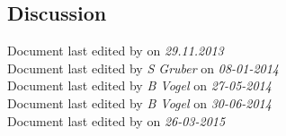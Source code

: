 \subsection*{Discussion}
Document last edited by \textit{\krauti} on \textit{29.11.2013}\\
Document last edited by \textit{S Gruber} on \textit{08-01-2014}\\
Document last edited by \textit{B Vogel} on \textit{27-05-2014}\\
Document last edited by \textit{B Vogel} on \textit{30-06-2014}\\
Document last edited by \textit{\ram} on \textit{26-03-2015}\\


